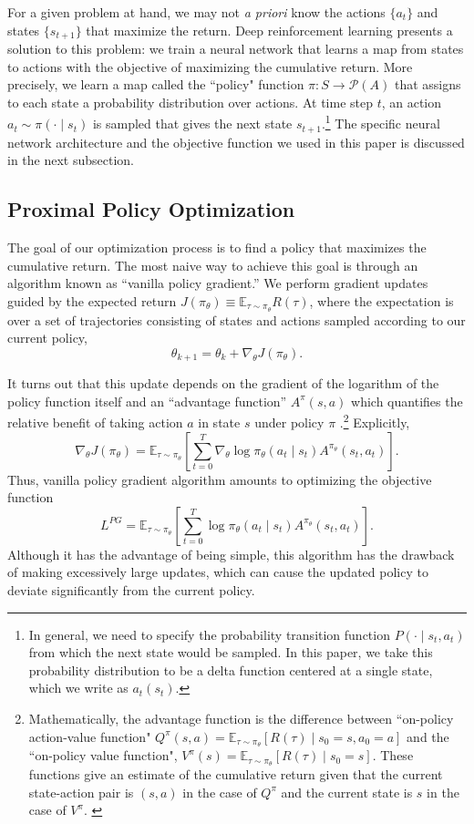 For a given problem at hand, we may not \textit{a priori} know the actions $\{a_t\}$ and states $\{s_{t+1}\}$ that maximize the return. Deep reinforcement learning presents a solution to this problem: we train a neural network that learns a map from states to actions with the objective of maximizing the cumulative return. More precisely, we learn a map called the ``policy" function $\pi \colon S \to \mathcal{P}(A)$ that assigns to each state a probability distribution over actions. At time step $t$, an action $a_t \sim \pi(\cdot \mid s_t)$ is sampled that gives the next state $s_{t+1}$.\footnote{
In general, we need to specify the probability transition function $P(\cdot \mid s_t, a_t)$  from which the next state would be sampled. In this paper, we take this probability distribution to be a delta function centered at a single state, which we write as $a_t(s_t)$.}
The specific neural network architecture and the objective function we used in this paper is discussed in the next subsection.

\subsection{Proximal Policy Optimization} \label{sec:ppo}

The goal of our optimization process is to find a policy that maximizes the cumulative return. The most naive way to achieve this goal is through an algorithm known as ``vanilla policy gradient.''
We perform gradient updates guided by the expected return $J(\pi_\theta) \equiv \mathbb{E}_{\tau \sim \pi_\theta} R(\tau)$, where the expectation is over a set of trajectories consisting of states and actions sampled according to our current policy,
\[
\theta_{k+1} = \theta_k + \nabla_\theta J(\pi_\theta).
\]

It turns out that this update depends on the gradient of the logarithm of the policy function itself and an ``advantage function'' \( A^\pi (s, a) \) which quantifies the relative benefit of taking action \( a \) in state \( s \) under policy \( \pi \) \cite{SpinningUp2018}.\footnote{
Mathematically, the advantage function is the difference between ``on-policy action-value function" $Q^{\pi}(s, a) = \mathbb{E}_{\tau \sim \pi_\theta} [R(\tau) \mid s_0 = s, a_0 = a]$ and the ``on-policy value function", $V^{\pi}(s) = \mathbb{E}_{\tau \sim \pi_\theta} [R(\tau) \mid s_0 = s]$.
These functions give an estimate of the cumulative return given that the current state-action pair is $(s, a)$ in the case of $Q^\pi$ and the current state is $s$ in the case of $V^{\pi}$.
\label{ft:advantage}}
Explicitly,
\[
\nabla_\theta J(\pi_\theta) =
\mathbb{E}_{\tau \sim \pi_\theta} \left[ \sum\limits_{t=0}^T \nabla_\theta \log \pi_\theta (a_t \mid s_t) A^{\pi_\theta} (s_t, a_t) \right].
\]
Thus, vanilla policy gradient algorithm amounts to optimizing the objective function
\[
L^{PG} = \mathbb{E}_{\tau \sim \pi_\theta} \left[ \sum\limits_{t=0}^T \log \pi_\theta (a_t \mid s_t) A^{\pi_\theta} (s_t, a_t) \right].
\]
Although it has the advantage of being simple, this algorithm has the drawback of making excessively large updates, which can cause the updated policy to deviate significantly from the current policy.

